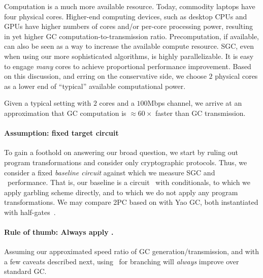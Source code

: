 Computation is a much more available resource.
Today, commodity laptops have four physical cores. Higher-end computing devices, such as desktop CPUs and GPUs have higher numbers of cores and/or per-core processing power,
resulting in yet higher GC computation-to-transmission ratio.
Precomputation, if available, can also be seen as a way to increase
the available compute resource.
SGC,  even when using our more sophisticated algorithms, is highly parallelizable.
It is easy to
engage \emph{many} cores to achieve proportional performance improvement.
%
Based on this discussion, and erring on the conservative side, we choose $2$ physical cores as a lower end of ``typical'' available computational power. 

Given a typical setting with $2$ cores and a
$100$Mbps channel, we arrive at an approximation that GC computation
is $\approx 60 \times$ faster than GC transmission.
%

%
%






\paragraph{Assumption: fixed target circuit}
To gain a foothold on answering our broad question, we start by ruling
out program transformations and consider only cryptographic protocols.
Thus, we consider a fixed {\em baseline circuit} against which we
measure SGC and \ourschemelong\ performance.    That is, our baseline is a
circuit \cir\ with conditionals, to which we apply garbling scheme
directly, and to which we do not apply any program transformations.
We may compare 2PC based on \ourschemelong with  Yao GC, both instantiated
with half-gates~\cite{EC:ZahRosEva15}.



\paragraph{Rule of thumb: Always apply \ourschemelong.}  Assuming our
approximated speed ratio of GC generation/transmission, and with a few caveats
described next, using \ourschemelong\ for branching will {\em always}
improve over standard GC. 

